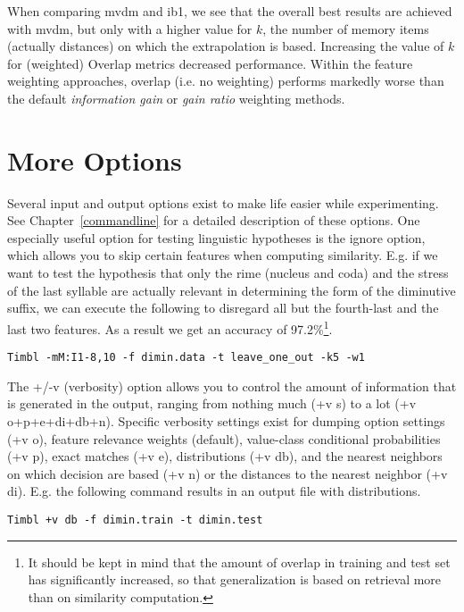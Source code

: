 \documentclass{report}
\begin{document}
When comparing {\sc mvdm} and {\sc ib1}, we see that the overall best
results are achieved with {\sc mvdm}, but only with a higher value for
$k$, the number of memory items (actually distances) on which the
extrapolation is based. Increasing the value of $k$ for (weighted)
Overlap metrics decreased performance. Within the feature weighting
approaches, overlap (i.e. no weighting) performs markedly worse than
the default {\em information gain} or {\em gain ratio} weighting
methods.

\section{More Options}

Several input and output options exist to make life easier while
experimenting. See Chapter~\ref{commandline} for a detailed
description of these options. One especially useful option for testing
linguistic hypotheses is the ignore option, which
allows you to skip certain features when computing similarity. E.g. if
we want to test the hypothesis that only the rime (nucleus and coda)
and the stress of the last syllable are actually relevant in
determining the form of the diminutive suffix, we can execute the
following to disregard all but the fourth-last and the last two
features. As a result we get an accuracy of 97.2\%\footnote{It should
be kept in mind that the amount of overlap in training and test set
has significantly increased, so that generalization is based on
retrieval more than on similarity computation.}.

{\small
\begin{verbatim}
Timbl -mM:I1-8,10 -f dimin.data -t leave_one_out -k5 -w1
\end{verbatim}
}


The {\sc +/-v} (verbosity) option allows you to control the amount of
information that is generated in the output, ranging from nothing much
({\sc +v s}) to a lot ({\sc +v o+p+e+di+db+n}). Specific verbosity
settings exist for dumping option settings ({\sc +v o}), feature
relevance weights (default), value-class conditional probabilities
({\sc +v p}), exact matches ({\sc +v e}), distributions ({\sc +v db}),
and the nearest neighbors on which decision are based ({\sc +v n}) or
the distances to the nearest neighbor ({\sc +v di}). E.g. the
following command results in an output file with distributions.

{\small
\begin{verbatim}
Timbl +v db -f dimin.train -t dimin.test
\end{verbatim}
}
\end{document}
